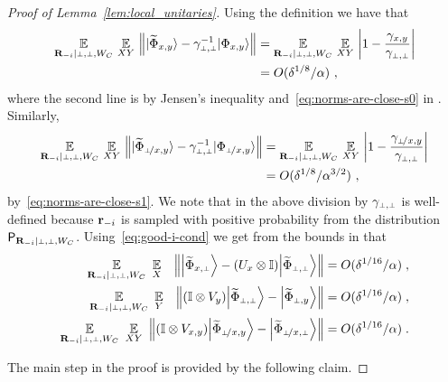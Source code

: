 \begin{proof}[Proof of Lemma~\ref{lem:local_unitaries}]
Using the definition we have that 
\begin{align}
\Ex_{\bR_\mi | \dummy, \dummy, W_C} \, \Ex_{XY} \,  \left \|\ket{\wt{\Phi}_{x,y}} - \gamma_{\dummy,\dummy}^{-1}\ket{\Phi_{x,y}} \right \| 
&= \Ex_{\bR_\mi | \dummy, \dummy, W_C} \,\Ex_{XY} \, \left|1 - \frac{\gamma_{x,y}}{\gamma_{\dummy,\dummy}} \right| \notag\\
& = O(\delta^{1/8}/\alpha)~,\label{eq:local_unitaries-0}
\end{align}
where the second line is by Jensen's inequality and~\eqref{eq:norms-are-close-s0} in . Similarly,
\begin{align}
\Ex_{\bR_\mi | \dummy, \dummy, W_C} \, \Ex_{XY} \,  \left \|\ket{\wt{\Phi}_{\pxy}} - \gamma_{\dummy,\dummy}^{-1}\ket{\Phi_{\pxy}} \right \| &= \Ex_{\bR_\mi | \dummy, \dummy, W_C} \,\Ex_{XY} \, \left|1 - \frac{\gamma_{\pxy}}{\gamma_{\dummy,\dummy}} \right|\notag\\
& = O(\delta^{1/8}/\alpha^{3/2})~,\label{eq:local_unitaries-0b}
\end{align}
by~\eqref{eq:norms-are-close-s1}. We note that in the above division by $\gamma_\pp$ is well-defined because $\mathbf{r}_{-i}$ is sampled with positive probability from the distribution $\P_{\bR_\mi | \dummy,\dummy,W_C}$. Using~\eqref{eq:good-i-cond} we get from the bounds in  that 
\begin{align}
	\Ex_{\bR_\mi | \dummy,\dummy,W_C} \,\, \Ex_X \,\, \,\,\, \left \| \bigket{\wt{\Phi}_\xp } - (U_{x} \otimes \Id)  \bigket{\wt{\Phi}_\pp}  \right \| &=  O(\delta^{1/16}/\alpha)\;,\label{eq:ux_bound-2}\\
	\Ex_{\bR_\mi | \dummy,\dummy,W_C} \,\, \Ex_Y \,\, \,\,\, \left \| (\Id \otimes V_{y})  \bigket{\wt{\Phi}_\pp}  - \bigket{\wt{\Phi}_\py }  \right \| &=  O(\delta^{1/16}/\alpha)\;,\label{eq:vy_bound-2}\\
	\Ex_{\bR_\mi | \dummy,\dummy,W_C} \,\, \Ex_{XY} \,\,  \left \|  (\Id \otimes V_{\xy})  \bigket{\wt{\Phi}_\pxy}  - \bigket{\wt{\Phi}_\pxp }  \right \| &=  O(\delta^{1/16}/\alpha)\;.\label{eq:vxy_bound-2}
		\end{align}

The main step in the proof is provided by the following claim. 


\end{proof}
